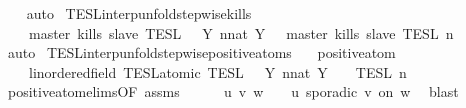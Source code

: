 \begin{isabellebody}
%
\isadelimproof
\ \ %
\endisadelimproof
%
\isatagproof
{}\isamarkupfalse%
\ auto%
\endisatagproof
{\isafoldproof}%
%
\isadelimproof
\isanewline
%
\endisadelimproof
\isanewline
{}\isamarkupfalse%
\ TESL{\isacharunderscore}interp{\isacharunderscore}unfold{\isacharunderscore}stepwise{\isacharunderscore}kills{\isacharcolon}\isanewline
\ \ \ {\isacartoucheopen}{\isasymlbrakk}\ master\ kills\ slave\ {\isasymrbrakk}\isactrlsub T\isactrlsub E\isactrlsub S\isactrlsub L\ {\isacharequal}\ {\isasymInter}\ {\isacharbraceleft}Y{\isachardot}\ {\isasymexists}n{\isacharcolon}{\isacharcolon}nat{\isachardot}\ Y\ {\isacharequal}\ {\isasymlbrakk}\ master\ kills\ slave\ {\isasymrbrakk}\isactrlsub T\isactrlsub E\isactrlsub S\isactrlsub L\isactrlbsup {\isasymge}\ n\isactrlesup {\isacharbraceright}{\isacartoucheclose}\isanewline
%
\isadelimproof
\ \ %
\endisadelimproof
%
\isatagproof
{}\isamarkupfalse%
\ auto%
\endisatagproof
{\isafoldproof}%
%
\isadelimproof
\isanewline
%
\endisadelimproof
\isanewline
{}\isamarkupfalse%
\ TESL{\isacharunderscore}interp{\isacharunderscore}unfold{\isacharunderscore}stepwise{\isacharunderscore}positive{\isacharunderscore}atoms{\isacharcolon}\isanewline
\ \ \ {\isacartoucheopen}positive{\isacharunderscore}atom\ {\isasymphi}{\isacartoucheclose}\isanewline
\ \ \ {\isacartoucheopen}{\isasymlbrakk}\ {\isasymphi}{\isacharcolon}{\isacharcolon}{\isacharprime}{\isasymtau}{\isacharcolon}{\isacharcolon}linordered{\isacharunderscore}field\ TESL{\isacharunderscore}atomic\ {\isasymrbrakk}\isactrlsub T\isactrlsub E\isactrlsub S\isactrlsub L\ {\isacharequal}\ {\isasymUnion}\ {\isacharbraceleft}Y{\isachardot}\ {\isasymexists}n{\isacharcolon}{\isacharcolon}nat{\isachardot}\ Y\ {\isacharequal}\ {\isasymlbrakk}\ {\isasymphi}\ {\isasymrbrakk}\isactrlsub T\isactrlsub E\isactrlsub S\isactrlsub L\isactrlbsup {\isasymge}\ n\isactrlesup {\isacharbraceright}{\isacartoucheclose}\isanewline
%
\isadelimproof
%
\endisadelimproof
%
\isatagproof
{}\isamarkupfalse%
\ {\isacharminus}\isanewline
\ \ \isamarkupfalse%
\ positive{\isacharunderscore}atom{\isachardot}elims{\isacharparenleft}{}{\isacharparenright}{\isacharbrackleft}OF\ assms{\isacharbrackright}\isanewline
\ \ \ \ \isamarkupfalse%
\ u\ v\ w\ \ {\isacartoucheopen}{\isasymphi}\ {\isacharequal}\ {\isacharparenleft}u\ sporadic\ v\ on\ w{\isacharparenright}{\isacartoucheclose}\ \isamarkupfalse%
\ blast\isanewline
\ \ \isamarkupfalse%

\end{isabellebody}
